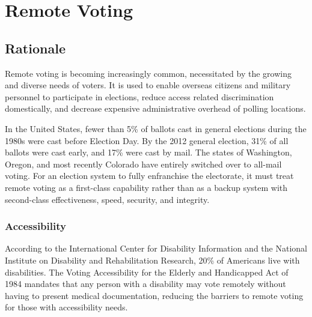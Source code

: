 \chapter{Remote Voting}
\label{chapter:remote_voting}

\section{Rationale}
Remote voting is becoming increasingly common, necessitated by the growing
and diverse needs of voters. It is used to enable overseas
citizens and military personnel to participate in elections, reduce
access related discrimination domestically, and decrease expensive
administrative overhead of polling locations. 

In the United States, fewer than 5\% of ballots cast in general
elections during the 1980s were cast before Election Day. By the 2012
general election, 31\% of all ballots were cast early, and 17\% were
cast by mail. The states of Washington, Oregon, and most recently
Colorado have entirely switched over to all-mail voting. For an
election system to fully enfranchise the electorate, it must treat
remote voting as a first-class capability rather than as a backup
system with second-class effectiveness, speed, security, and
integrity.

\subsection{Accessibility}
According to the International Center for Disability Information and
the National Institute on Disability and Rehabilitation Research, 20\%
of Americans live with disabilities. The Voting Accessibility for the
Elderly and Handicapped Act of 1984 mandates that any person with a
disability may vote remotely without having to present medical
documentation, reducing the barriers to remote voting for those with
accessibility needs.


